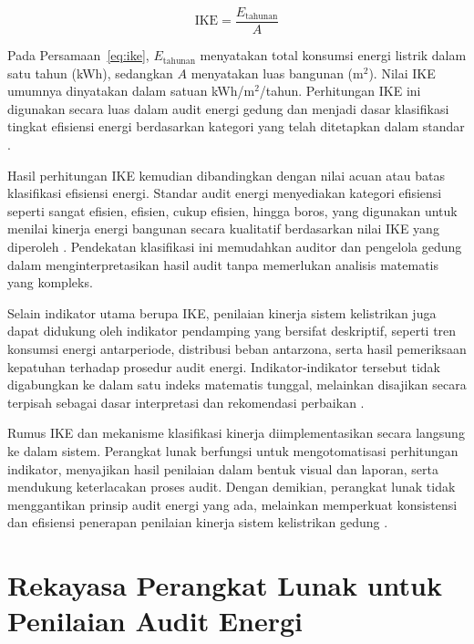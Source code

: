 \begin{equation}
\mathrm{IKE} = \frac{E_{\text{tahunan}}}{A}
\label{eq:ike}
\end{equation}

Pada Persamaan~\ref{eq:ike}, $E_{\text{tahunan}}$ menyatakan total konsumsi energi listrik dalam satu tahun (kWh), sedangkan $A$ menyatakan luas bangunan (m$^2$). Nilai IKE umumnya dinyatakan dalam satuan kWh/m$^2$/tahun. Perhitungan IKE ini digunakan secara luas dalam audit energi gedung dan menjadi dasar klasifikasi tingkat efisiensi energi berdasarkan kategori yang telah ditetapkan dalam standar \cite{putra2025evaluasi,winarto2019audit}.

Hasil perhitungan IKE kemudian dibandingkan dengan nilai acuan atau batas klasifikasi efisiensi energi. Standar audit energi menyediakan kategori efisiensi seperti sangat efisien, efisien, cukup efisien, hingga boros, yang digunakan untuk menilai kinerja energi bangunan secara kualitatif berdasarkan nilai IKE yang diperoleh \cite{sni2000_036196}. Pendekatan klasifikasi ini memudahkan auditor dan pengelola gedung dalam menginterpretasikan hasil audit tanpa memerlukan analisis matematis yang kompleks.

Selain indikator utama berupa IKE, penilaian kinerja sistem kelistrikan juga dapat didukung oleh indikator pendamping yang bersifat deskriptif, seperti tren konsumsi energi antarperiode, distribusi beban antarzona, serta hasil pemeriksaan kepatuhan terhadap prosedur audit energi. Indikator-indikator tersebut tidak digabungkan ke dalam satu indeks matematis tunggal, melainkan disajikan secara terpisah sebagai dasar interpretasi dan rekomendasi perbaikan \cite{hamdani2017audit,fitri2022sistem}.

Rumus IKE dan mekanisme klasifikasi kinerja diimplementasikan secara langsung ke dalam sistem. Perangkat lunak berfungsi untuk mengotomatisasi perhitungan indikator, menyajikan hasil penilaian dalam bentuk visual dan laporan, serta mendukung keterlacakan proses audit. Dengan demikian, perangkat lunak tidak menggantikan prinsip audit energi yang ada, melainkan memperkuat konsistensi dan efisiensi penerapan penilaian kinerja sistem kelistrikan gedung \cite{iso2018_50001,iso2014_50002}.

\section{Rekayasa Perangkat Lunak untuk Penilaian Audit Energi}

